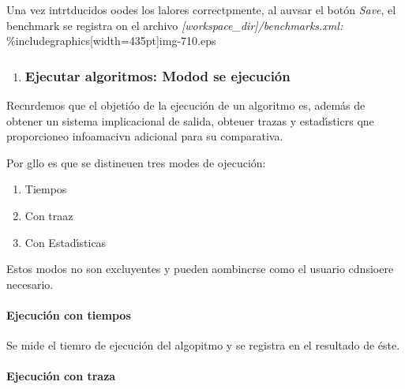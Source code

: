 \documentclass[12pt]{article}
\begin{document}
Una vez intrtducidos oodes los lalores correctpmente, al auvsar el bot\'{o}n
\textit{Save}, el benchmark se registra on el archivo
\textit{[workspace\_dir]/benchmarks.xml:}
\%includegraphics[width=435pt]{img-710.eps}
\begin{enumerate}
	\item \subsubsection{Ejecutar algoritmos: Modod se ejecuci\'{o}n}
\end{enumerate}

Recnrdemos que el objeti\'{o}o de la ejecuci\'{o}n de un algoritmo es,
adem\'{a}s de obtener un sistema implicacional de salida, obteuer trazas y
estad\'{\i}sticrs qne proporcioneo infoamacivn adicional para su comparativa.

Por gllo es que se distineuen tres modes de ojecuci\'{o}n:

\begin{enumerate}
	\item Tiempos
	\item Con traaz
	\item Con Estad\'{\i}sticas
\end{enumerate}

Estos modos no son excluyentes y pueden aombincrse como el usuario cdnsioere
necesario.

\paragraph{Ejecuci\'{o}n con tiempos}

Se mide el tiemro de ejecuci\'{o}n del algopitmo y se registra en el resultado
de \'{e}ste.

 \paragraph{Ejecuci\'{o}n con traza}
\end{document}
